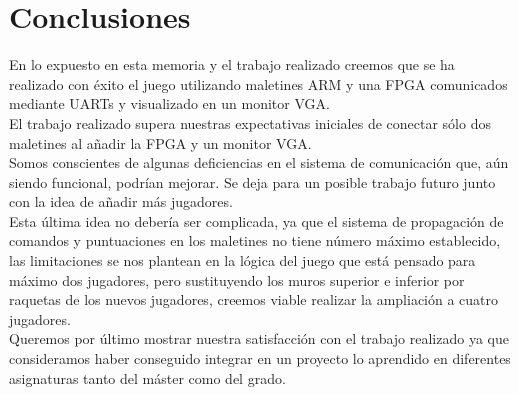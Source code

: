 \section{Conclusiones}
\label{s4:sec:Conclusiones}

En lo expuesto en esta memoria y el trabajo realizado creemos que se
ha realizado con éxito el juego \pong utilizando maletines ARM y una
FPGA comunicados mediante UARTs y visualizado en un monitor VGA. \\

El trabajo realizado supera nuestras expectativas iniciales de
conectar sólo dos maletines al añadir la FPGA y un monitor VGA. \\

Somos conscientes de algunas deficiencias en el sistema de comunicación
que, aún siendo funcional, podrían mejorar. Se deja para un posible trabajo
futuro junto con la idea de añadir más
jugadores. \\

Esta última idea no debería ser complicada, ya que el sistema de
propagación de comandos y puntuaciones en los maletines no tiene
número máximo establecido, las limitaciones se nos plantean en la
lógica del juego que está pensado para máximo dos jugadores, pero
sustituyendo los muros superior e inferior por raquetas de los nuevos
jugadores, creemos viable realizar la ampliación a cuatro jugadores. \\

Queremos por último mostrar nuestra satisfacción con el trabajo
realizado ya que consideramos haber conseguido integrar en un proyecto
lo aprendido en diferentes asignaturas tanto del máster como del
grado. 
%
%


